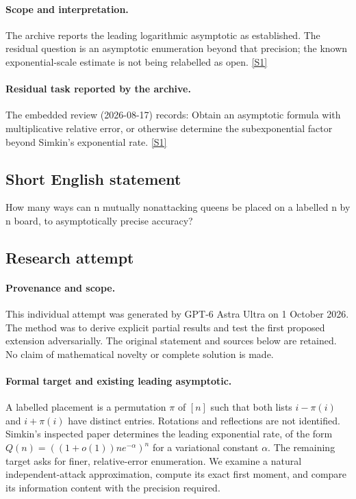 \documentclass[11pt,a4paper]{article}
\newcommand{\sref}[2]{\hyperlink{source:#1:#2}{[S#2]}}
\begin{document}
\paragraph{Scope and interpretation.}

The archive reports the leading logarithmic asymptotic as established. The residual question is an asymptotic enumeration beyond that precision; the known exponential-scale estimate is not being relabelled as open. \sref{1097}{1}

\paragraph{Residual task reported by the archive.}

The embedded review (2026-08-17) records: Obtain an asymptotic formula with multiplicative relative error, or otherwise determine the subexponential factor beyond Simkin's exponential rate. \sref{1097}{1}

\subsection{Short English statement}

How many ways can n mutually nonattacking queens be placed on a labelled n by n board, to asymptotically precise accuracy?

\subsection{Research attempt}

\paragraph{Provenance and scope.}
This individual attempt was generated by GPT-6 Astra Ultra on 1 October 2026. The method was to derive explicit partial results and test the first proposed extension adversarially. The original statement and sources below are retained. No claim of mathematical novelty or complete solution is made.

\paragraph{Formal target and existing leading asymptotic.}
A labelled placement is a permutation $\pi$ of $[n]$ such that both lists $i-\pi(i)$ and $i+\pi(i)$ have distinct entries. Rotations and reflections are not identified. Simkin's inspected paper determines the leading exponential rate, of the form $Q(n)=((1+o(1))ne^{-\alpha})^n$ for a variational constant $\alpha$. The remaining target asks for finer, relative-error enumeration. We examine a natural independent-attack approximation, compute its exact first moment, and compare its information content with the precision required.
\end{document}
